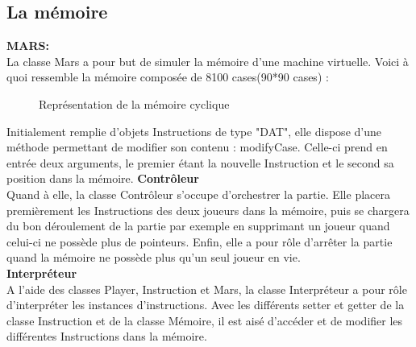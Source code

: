 \documentclass[a4paper,12pt]{article}
\begin{document}
\subsection{La mémoire}
\textbf{MARS:}\\
La classe Mars a pour but de simuler la mémoire d’une machine virtuelle.
Voici à quoi ressemble la mémoire composée de 8100 cases(90*90 cases) :\\
\bigbreak
\begin{figure}[H]
\caption{Représentation de la mémoire cyclique}
\end{figure}
Initialement remplie d’objets Instructions de type "DAT", elle dispose d’une méthode permettant de modifier son contenu : modifyCase. 
Celle-ci prend en entrée deux arguments, le premier étant la nouvelle Instruction et le second sa position dans la mémoire.
\bigbreak
\textbf{Contrôleur}\\
Quand à elle, la classe Contrôleur s’occupe d'orchestrer la partie. Elle placera premièrement les Instructions des deux joueurs dans la mémoire, puis se chargera du bon déroulement de la partie par exemple en supprimant un joueur quand celui-ci ne possède plus de pointeurs. Enfin, elle a pour rôle d'arrêter la partie quand la mémoire ne possède plus qu’un seul joueur en vie.\\
\textbf{Interpréteur}\\
A l’aide des classes Player, Instruction et Mars, la classe Interpréteur a pour rôle d'interpréter les instances d’instructions. Avec les différents setter et getter de la classe Instruction et de la classe Mémoire, il est aisé d'accéder et de modifier les différentes Instructions dans la mémoire.
\pagebreak
\end{document}
